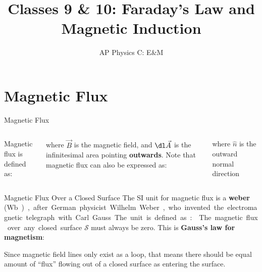 \documentclass[12pt,aspectratio=169]{beamer}
\title{Classes 9 \& 10: Faraday's Law and Magnetic Induction}
\subtitle{AP Physics C: E\&M}
\begin{document}
\begin{frame}
  \maketitle
\end{frame}


\section{Magnetic Flux}


\begin{frame}{Magnetic Flux}
  \begin{columns}
  
    Magnetic flux is defined as:
    
    
    where $\vec B$ is the magnetic field, and $\dl\vec A$ is the infinitesimal
    area pointing \textbf{outwards}. Note that magnetic flux can also be
    expressed as:


    where $\hat n$ is the outward normal direction
  \end{columns}
\end{frame}



\begin{frame}{Magnetic Flux Over a Closed Surface}
  The SI unit for magnetic flux is a \textbf{weber} (\si\weber), after
  German physicist Wilhelm Weber, who invented the electromagnetic telegraph
  with Carl Gauss. The unit is defined as:

  
  The magnetic flux over any closed surface $\mathcal S$ must always be zero.
  This is \textbf{Gauss's law for magnetism}:


  Since magnetic field lines only exist as a loop, that means there should be
  equal amount of ``flux'' flowing out of a closed surface as entering the
  surface.
\end{frame}
\end{document}
